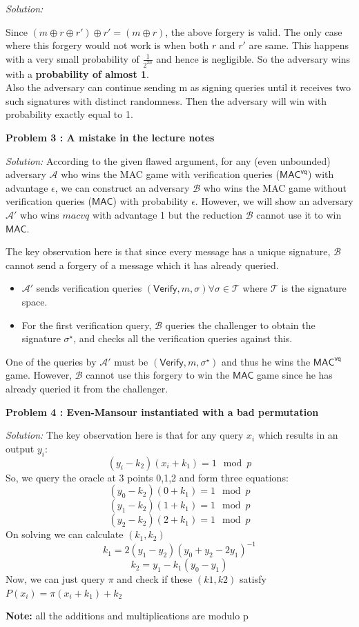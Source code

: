 \documentclass[a4paper, 11pt]{article}
\newenvironment{solution}
    {\textit{Solution:}}
    {\clearpage}
\newcommand{\prob}[1]{\begin{mdframed}[backgroundcolor=gray!20] \textbf{Problem #1}\end{mdframed}}
\newcommand{\verify}{\mathsf{Verify}}
\newcommand{\macvq}{\mathsf{MAC^{vq}}}
\newcommand{\mac}{\mathsf{MAC}}
\newcommand{\calA}{\mathcal{A}}
\newcommand{\calB}{\mathcal{B}}
\newcommand{\calT}{\mathcal{T}}
\begin{document}
\begin{solution}
\begin{enumerate}[(a)]
    Since $(m \oplus r \oplus r') \oplus r' = (m \oplus r)$, the above forgery is valid. The only case where this forgery would not work is when both $r$ and $r'$ are same. This happens with a very small probability of $\frac{1}{2^{2n}}$ and hence is negligible. So the adversary wins with a \textbf{probability of almost 1}. \\
    Also the adversary can continue sending m as signing queries until it receives two such signatures with distinct randomness. Then the adversary will win with probability exactly equal to 1.
 \end{enumerate}
\end{solution}


\prob{3 : A mistake in the lecture notes}
\begin{solution}
    According to the given flawed argument, for any (even unbounded) adversary $\calA$ who wins the MAC game with verification queries ($\macvq$) with advantage $\epsilon$, we can construct an adversary $\calB$ who wins the MAC game without verification queries ($\mac$) with probability $\epsilon$. However, we will show an adversary $\calA'$ who wins  $macvq$ with advantage 1 but the reduction $\calB$ cannot use it to win $\mac$.

    The key observation here is that since every message has a unique signature, $\calB$ cannot send a forgery of a message which it has already queried. 
    \begin{itemize}
        \item $\calA'$ sends verification queries $(\verify , m, \sigma) \forall \sigma\in\calT$ where $\calT$ is the signature space.
        \item For the first verification query, $\calB$ queries the challenger to obtain the signature $\sigma^\star$, and checks all the verification queries against this.
    \end{itemize} 
    One of the queries by $\calA'$ must be $(\verify , m, \sigma^\star)$ and thus he wins the $\macvq$ game. However, $\calB$ cannot use this forgery to win the $\mac$ game since he has already queried it from the challenger.

\end{solution}


\prob{4 : Even-Mansour instantiated with a bad permutation}
\begin{solution}
   The key observation here is that for any query $x_i$ which results in an output $y_i$:
   $$(y_i-k_2)(x_i+k_1)=1 \mod p$$
   So, we query the oracle at 3 points 0,1,2 and form three equations:
   $$(y_0-k_2)(0+k_1)=1 \mod p$$
   $$(y_1-k_2)(1+k_1)=1 \mod p$$
   $$(y_2-k_2)(2+k_1)=1 \mod p$$
   On solving we can calculate $(k_1,k_2)$
   $$k_1=2(y_1-y_2)(y_0+y_2-2y_1)^{-1}$$
   $$k_2=y_1-k_1(y_0-y_1)$$
   Now, we can just query $\pi$ and check if these $(k1,k2)$ satisfy $P(x_i)=\pi(x_i+k_1)+k_2$
   
   \noindent\textbf{Note:} all the additions and multiplications are modulo p
\end{solution}
\end{document}

